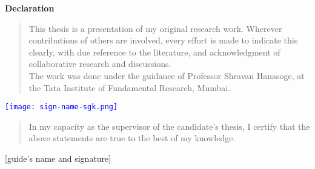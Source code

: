 \centerline{\Large\bf Declaration} \vspace{1cm}
\begin{quote}
This thesis is a presentation of my original research work. 
Wherever contributions of others are involved, every effort is made 
to indicate this clearly, with due reference to the literature, 
and acknowledgment of collaborative research and discussions. \\

The work was done under the guidance of Professor Shravan Hanasoge, 
at the Tata Institute of Fundamental Research, Mumbai.
\end{quote}

\vspace{2.5cm}
\begin{flushright}
\hspace{10cm} 
\textcolor{blue}{\texttt{[image: sign-name-sgk.png]}}
\end{flushright}
\vspace{2.5cm}

\begin{quote}
In my capacity as the supervisor of the candidate's thesis, I certify that 
the above statements are true to the best of my knowledge.
\end{quote}
\vspace{2.5cm}
\hspace{0cm} [guide's name and signature]

